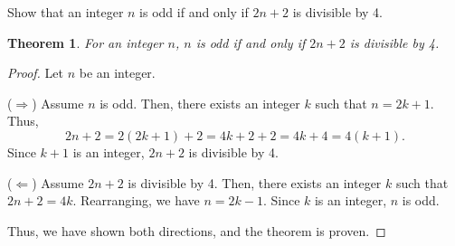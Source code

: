 \documentclass{article}
\newtheorem*{theorem}{Theorem}
\theoremstyle{definition}
\begin{document}
\begin{question}
    Show that an integer $n$ is odd if and only if $2n+2$ is divisible by 4.
\end{question}
\begin{solution}
    \begin{theorem}
        For an integer $n$, $n$ is odd if and only if $2n+2$ is divisible by 4.
    \end{theorem}
    \begin{proof}
        Let $n$ be an integer.
        
        ($\Rightarrow$) Assume $n$ is odd. Then, there exists an integer $k$ such that $n = 2k + 1$. Thus,
        \[
            2n + 2 = 2(2k + 1) + 2 = 4k + 2 + 2 = 4k + 4 = 4(k + 1).
        \]
        Since $k + 1$ is an integer, $2n + 2$ is divisible by 4.
        
        ($\Leftarrow$) Assume $2n + 2$ is divisible by 4. Then, there exists an integer $k$ such that $2n + 2 = 4k$. Rearranging, we have $n = 2k - 1$. Since $k$ is an integer, $n$ is odd.
        
        Thus, we have shown both directions, and the theorem is proven.
    \end{proof}
\end{solution}
\end{document}
